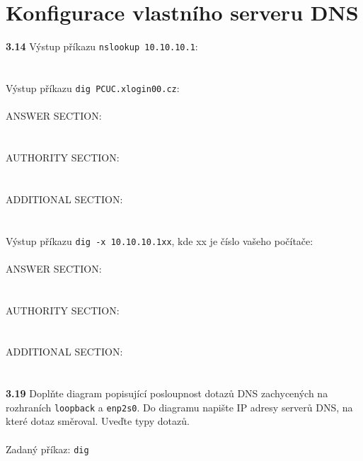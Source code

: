 \documentclass[a4paper,11pt]{article}
\begin{document}
\section{Konfigurace vlastního serveru DNS}
\textbf{3.14} Výstup příkazu \texttt{nslookup 10.10.10.1}:
\\
\\
\\
\hspace*{0.7cm} Výstup příkazu \texttt{dig PCUC.xlogin00.cz}:
\\
\\
{\footnotesize \hspace*{0.8cm}ANSWER SECTION:
\\
\\
\\
\hspace*{0.8cm}AUTHORITY SECTION:
\\
\\
\\
\hspace*{0.8cm}ADDITIONAL SECTION:}
\\
\\
\\
\hspace*{0.7cm} Výstup příkazu \texttt{dig -x 10.10.10.1xx}, kde xx je číslo vašeho počítače:
\\
\\
{\footnotesize \hspace*{0.8cm}ANSWER SECTION:
\\
\\
\\
\hspace*{0.8cm}AUTHORITY SECTION:
\\
\\
\\
\hspace*{0.8cm}ADDITIONAL SECTION:}
\\
\\
\\
\textbf{3.19} Doplňte diagram popisující posloupnost dotazů DNS zachycených na rozhraních \texttt{loopback} a \texttt{enp2s0}. Do diagramu napište IP adresy serverů DNS, na které dotaz směroval. Uveďte typy dotazů. 
\\
\\
\hspace*{0.8cm}Zadaný příkaz: \texttt{dig }\underline{\hspace{4.5cm}}
\end{document}
